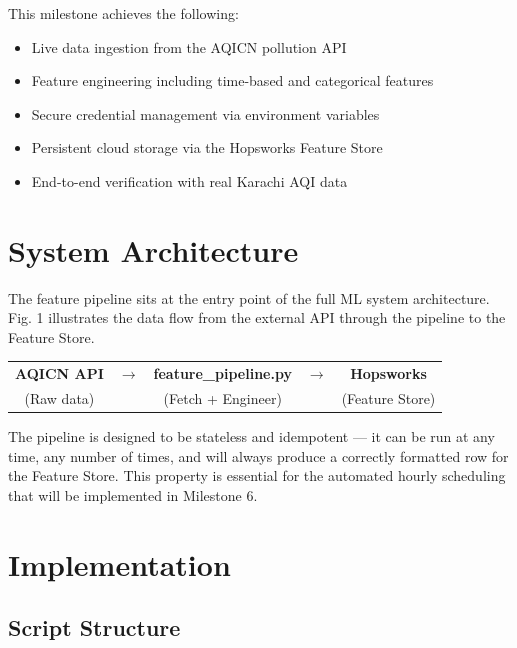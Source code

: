 \documentclass[conference]{IEEEtran}
\begin{document}
This milestone achieves the following:
\begin{itemize}[leftmargin=1.5em, itemsep=2pt]
    \item Live data ingestion from the AQICN pollution API
    \item Feature engineering including time-based and categorical features
    \item Secure credential management via environment variables
    \item Persistent cloud storage via the Hopsworks Feature Store
    \item End-to-end verification with real Karachi AQI data
\end{itemize}

\section{System Architecture}

The feature pipeline sits at the entry point of the full ML system architecture. Fig. 1 illustrates the data flow from the external API through the pipeline to the Feature Store.

\begin{center}
\begin{tabular}{ccccc}
\textbf{AQICN API}&$\rightarrow$& \textbf{feature\_pipeline.py} & $\rightarrow$ & \textbf{Hopsworks} \\
(Raw data) & & (Fetch + Engineer) & & (Feature Store) \\
\end{tabular}
\end{center}

\vspace{6pt}
The pipeline is designed to be stateless and idempotent — it can be run at any time, any number of times, and will always produce a correctly formatted row for the Feature Store. This property is essential for the automated hourly scheduling that will be implemented in Milestone 6.

\section{Implementation}

\subsection{Script Structure}
\end{document}
